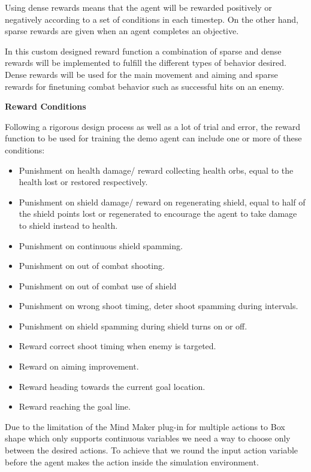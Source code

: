 \documentclass[a4paper,one side,12pt]{book}
\begin{document}
Using dense rewards means that the agent will be rewarded positively or
negatively according to a set of conditions in each timestep. On the
other hand, sparse rewards are given when an agent completes an
objective.

In this custom designed reward function a combination of sparse and
dense rewards will be implemented to fulfill the different types of
behavior desired. Dense rewards will be used for the main movement and
aiming and sparse rewards for finetuning combat behavior such as
successful hits on an enemy.

\textbf{Reward Conditions}

Following a rigorous design process as well as a lot of trial and error,
the reward function to be used for training the demo agent can
include one or more of these conditions:

\begin{itemize}
\item
  Punishment on health damage/ reward collecting health orbs, equal to
  the health lost or restored respectively.
\item
  Punishment on shield damage/ reward on regenerating shield, equal to
  half of the shield points lost or regenerated to encourage the agent
  to take damage to shield instead to health.
\item
  Punishment on continuous shield spamming.
\item
  Punishment on out of combat shooting.
\item
  Punishment on out of combat use of shield
\item
  Punishment on wrong shoot timing, deter shoot spamming during
  intervals.
\item
  Punishment on shield spamming during shield turns on or off.
\item
  Reward correct shoot timing when enemy is targeted.
\item
  Reward on aiming improvement.
\item
  Reward heading towards the current goal location.
\item 
  Reward reaching the goal line.
\end{itemize}

Due to the limitation of the Mind Maker plug-in for multiple actions to
Box shape which only supports continuous variables we need a way to choose only between the desired actions. 
To achieve that we round the input action variable before the agent makes the action inside the simulation environment.
\end{document}
